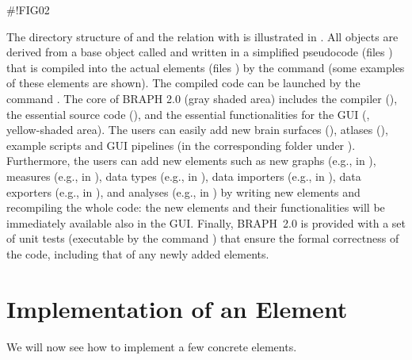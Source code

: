 \documentclass{tufte-handout}
\begin{document}
#!FIG02

The directory structure of  and the relation with  is illustrated in .
All objects are derived from a base object called  and written in a simplified pseudocode (files ) that is compiled into the actual elements (files ) by the command  (some examples of these elements are shown).
The compiled code can be launched by the command .
The core of BRAPH 2.0 (gray shaded area) includes the compiler (), the essential source code (), and the essential functionalities for the GUI (, yellow-shaded area).
The users can easily add new brain surfaces (), atlases (), example scripts and GUI pipelines (in the corresponding folder under ).
Furthermore, the users can add new elements such as new graphs (e.g.,  in ), measures (e.g.,  in ), data types (e.g.,  in ), data importers (e.g.,  in ), data exporters (e.g.,  in ), and analyses (e.g.,  in ) by writing new elements and recompiling the whole code: the new elements and their functionalities will be immediately available also in the GUI.
Finally, BRAPH~2.0 is provided with a set of unit tests (executable by the command ) that ensure the formal correctness of the code, including that of any newly added elements.

\section{Implementation of an Element}

We will now see how to implement a few concrete elements.
\end{document}
